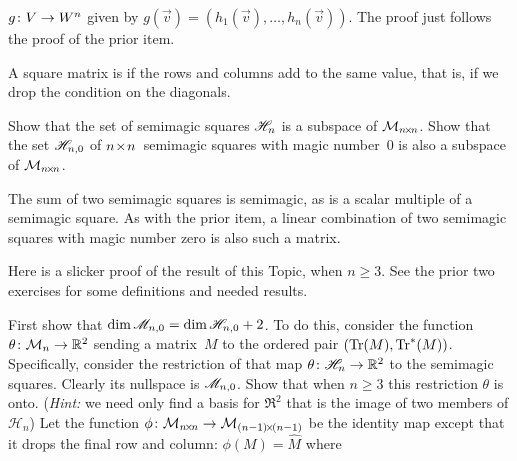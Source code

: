 \begin{exercises}
\begin{answer}
\begin{exparts}
         $\mbox{$g\colon V\to W^n$}$ given by
         $g(\vec{v})=(h_1(\vec{v}), \ldots, h_n(\vec{v}))$.
         The proof just follows the proof of the prior item.
      \end{exparts}
    \end{answer}
  \item A square matrix is  if 
     the rows and columns add to the same value, that is, if we drop the
     condition on the diagonals.
     \begin{exparts*}
       \partsitem
         Show that the set of semimagic squares $\mathscr{H}_n$ 
         is a subspace of $\mathcal{M}_{n \! \times \! n}$.
       \partsitem
         Show that 
         the set $\mathscr{H}_{n,0}$  
         of $n \! \times \! n$~semimagic squares with magic number~$0$
         is also a subspace of $\mathcal{M}_{n \! \times \! n}$.
     \end{exparts*}
     \begin{answer}
       \begin{exparts*}
         \partsitem
           The sum of two semimagic squares is semimagic, as is a scalar 
           multiple of a semimagic square.
         \partsitem
           As with the prior item, a linear combination of two semimagic
           squares with magic number zero is also such a matrix.
       \end{exparts*}
     \end{answer}
  \item 
    \cite{Beardon}
    Here is a slicker proof of the result of this Topic, when $n\geq 3$.
    See the prior two exercises for some definitions and needed results.
    \begin{exparts}
      \partsitem
        First show that 
        $\dim\mathscr{M}_{n,0}=\dim\mathscr{H}_{n,0}+2$.
        To do this, consider the function
        $\mbox{$\theta\colon \mathcal{M}_n\to \mathbb{R}^2$}$ sending a 
        matrix~$M$ to
        the ordered pair $(\operatorname{Tr}(M),\operatorname{Tr}^*(M))$.
        Specifically, consider the restriction of that map
        $\mbox{$\theta\colon \mathscr{H}_n\to \mathbb{R}^2$}$ to the semimagic squares.  
        Clearly its nullspace is $\mathscr{M}_{n,0}$.
        Show that when $n\geq 3$ this restriction $\theta$ is onto.
        (\textit{Hint:} we need only find a basis for 
           $\Re^2$ that is the
           image of two members of $\mathcal{H}_n$)  
      \partsitem
        Let the function $\mbox{$\phi\colon \mathcal{M}_{n \! \times \! n}\to \mathcal{M}_{(n-1) \! \times \! (n-1)}$}$
        be the identity map except that it 
        drops the final row and column: $\phi(M)=\hat{M}$ where 

\end{exparts}
\end{exercises}
